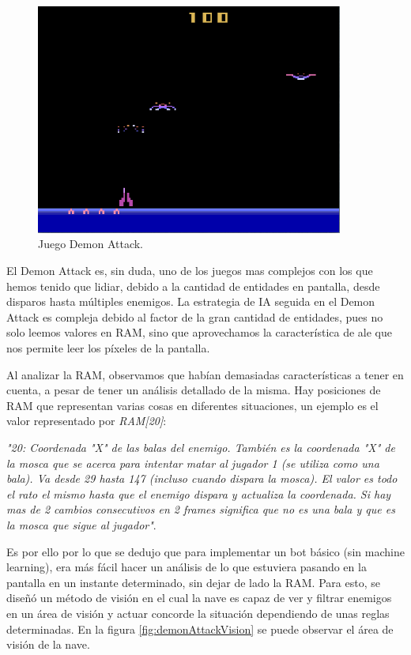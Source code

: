 \begin{figure}[h]
	\centering
	\includegraphics[width=0.9\textwidth]{Figures/demonAttackOne}
	\caption{Juego Demon Attack.}
	\label{fig:demonattackone}
\end{figure}

El Demon Attack es, sin duda, uno de los juegos mas complejos con los que hemos tenido que lidiar, debido a la cantidad de entidades en pantalla, desde disparos hasta múltiples enemigos. La estrategia de IA seguida en el Demon Attack es compleja debido al factor de la gran cantidad de entidades, pues no solo leemos valores en RAM, sino que aprovechamos la característica de \ac{ale} que nos permite leer los píxeles de la pantalla.

Al analizar la RAM, observamos que habían demasiadas características a tener en cuenta, a pesar de tener un análisis detallado de la misma. Hay posiciones de RAM que representan varias cosas en diferentes situaciones, un ejemplo es el valor representado por \textit{RAM[20]}: 

\newpage
\textit{"20: Coordenada "X" de las balas del enemigo. También es la coordenada "X" de la mosca que se acerca para intentar matar al jugador 1 (se utiliza como una bala). Va desde 29 hasta 147 (incluso cuando dispara la mosca). El valor es todo el rato el mismo hasta que el enemigo dispara y actualiza la coordenada. Si hay mas de 2 cambios consecutivos en 2 frames significa que no es una bala y que es la mosca que sigue al jugador"}.

Es por ello por lo que se dedujo que para implementar un bot básico (sin machine learning), era más fácil hacer un análisis de lo que estuviera pasando en la pantalla en un instante determinado, sin dejar de lado la RAM. Para esto, se diseñó un método de visión en el cual la nave es capaz de ver y filtrar enemigos en un área de visión y actuar concorde la situación dependiendo de unas reglas determinadas. En la figura \ref{fig:demonAttackVision} se puede observar el área de visión de la nave.

